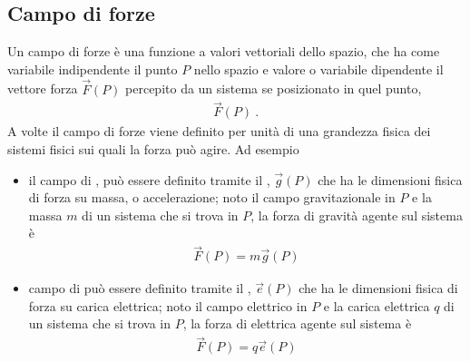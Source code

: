 \documentclass[letterpaper,10pt,italian]{jupyterBook}
\begin{document}
\subsection{Campo di forze}
\label{\detokenize{ch/mechanics/actions-types:campo-di-forze}}\label{\detokenize{ch/mechanics/actions-types:physics-hs-mechanics-actions-def-field}}
\sphinxAtStartPar
Un campo di forze è una funzione a valori vettoriali dello spazio, che ha come variabile indipendente il punto \(P\) nello spazio e valore \sphinxhyphen{} o variabile dipendente \sphinxhyphen{} il vettore forza \(\vec{F}(P)\) percepito da un sistema se posizionato in quel punto,
\begin{equation*}
\begin{split}\vec{F}(P) \ .\end{split}
\end{equation*}
\sphinxAtStartPar
A volte il campo di forze viene definito per unità di una grandezza fisica dei sistemi fisici sui quali la forza può agire. Ad esempio
\begin{itemize}
\item {} 
\sphinxAtStartPar
il campo di {\hyperref[\detokenize{ch/mechanics/actions-examples:physics-hs-mechanics-actions-gravitation-newton}]{}}, può essere definito tramite il {\hyperref[\detokenize{ch/mechanics/actions-examples:physics-hs-mechanics-actions-gravitation-newton}]{}}, \(\vec{g}(P)\) che ha le dimensioni fisica di forza su massa, o accelerazione; noto il campo gravitazionale in \(P\) e la massa \(m\) di un sistema che si trova in \(P\), la forza di gravità agente sul sistema è
\begin{equation*}
\begin{split}\vec{F}(P) = m \vec{g}(P)\end{split}
\end{equation*}
\item {} 
\sphinxAtStartPar
campo di {\hyperref[\detokenize{ch/electromagnetism/electrostatics:physics-hs-electromagnetism-electrostatics-coulomb}]{}} può essere definito tramite il {\hyperref[\detokenize{ch/electromagnetism/electrostatics:physics-hs-electromagnetism-electrostatics-e-field}]{}}, \(\vec{e}(P)\) che ha le dimensioni fisica di forza su carica elettrica; noto il campo elettrico in \(P\) e la carica elettrica \(q\) di un sistema che si trova in \(P\), la forza di elettrica agente sul sistema è
\begin{equation*}
\begin{split}\vec{F}(P) = q \vec{e}(P)\end{split}
\end{equation*}
\end{itemize}
\end{document}

